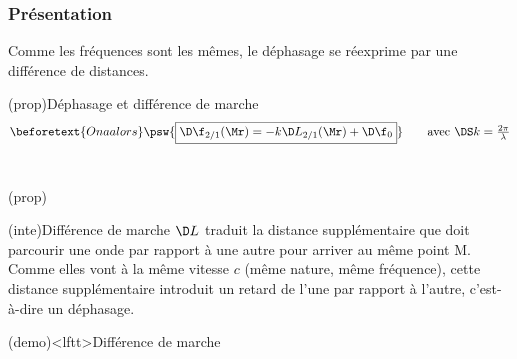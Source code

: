 \documentclass[../../main/main.tex]{subfiles}
\begin{document}
\subsubsection{Présentation}
Comme les fréquences sont les mêmes, le déphasage se réexprime par une
différence de distances.
\begin{tcb*}(prop){Déphasage et différence de marche}
	\vspace{-15pt}
	\begin{gather*}
		\beforetext{On a alors}
		\psw{\boxed{\D\f_{2/1}(\Mr) = -k\D L_{2/1}(\Mr) + \D\f_0}}
		\tag*{avec $\DS k = \frac{2\pi}{\lambda}$}
	\end{gather*}
	~
	\vspace{-15pt}
	\smallbreak
	\begin{isd}(prop)
		\psw{%
			\[
				\boxed{\Delta{L_{2/1}}(\Mr) = \SbMr - \SaMr}
			\]
		}%
		\vspace{-15pt}
		\tcblower
		\psw{%
			\[
				\boxed{\D\f_0 = \f_{02}-\f_{01}}
			\]
		}%
		\vspace{-15pt}
	\end{isd}
\end{tcb*}

\begin{tcb}(inte){Différence de marche}
	$\D L$ traduit la distance supplémentaire que doit parcourir une onde par
	rapport à une autre pour arriver au même point M. Comme elles vont à la même
	vitesse $c$ (même nature, même fréquence), cette distance supplémentaire
	introduit un retard de l'une par rapport à l'autre, c'est-à-dire un déphasage.
\end{tcb}

\begin{tcb}(demo)<lftt>{Différence de marche}
	\psw{%
		\[
			\Delta{\f}_{2/1}(\Mr) =
			-k\SbMr + \f_{02} - \pa{-k\SaMr + \f_{01}} =
			-k \pa{\SbMr - \SaMr} + \f_{02} - \f_{01}
		\]
	}%
	\vspace{-15pt}
\end{tcb}
\end{document}
